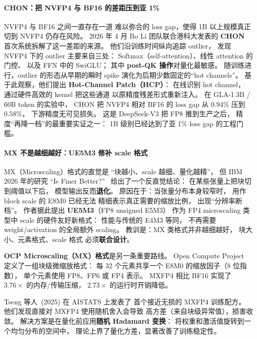 \paragraph{CHON：把 NVFP4 与 BF16 的差距压到亚 1\%}
NVFP4 与 BF16 之间一直存在一道
难以弥合的 loss gap，使得 1B 以上规模真正切到 NVFP4
仍存在风险。
2026 年 4 月 Bo Li 团队联合港科大发表的
\textbf{CHON}~\cite{chon_nvfp4_2026}
首次系统拆解了这一差距的来源。
他们沿训练时间纵向追踪 outlier，
发现 NVFP4 下的 outlier 主要来自三处：
Softmax（self-attention）、线性 attention 的门控、
以及 FFN 中的 SwiGLU；
其中\textbf{ post-QK 操作}对量化最敏感。
随训练进行，outlier 的形态从早期的瞬时 spike
演化为后期少数固定的“hot channels”。
基于此观察，他们提出
\textbf{Hot-Channel Patch（HCP）}：
在线识别 hot channel，
通过硬件高效的 kernel 把这些通道
以原精度残差形式重新注入。
在 GLA-1.3B / 60B token 的实验中，
CHON 把 NVFP4 相对 BF16 的 loss gap
从 $0.94\%$ 压到 $0.58\%$，
下游精度无可见损失。
这是 DeepSeek-V3 把 FP8 推到生产之后，
精度“再降一档”的最重要实证之一：
1B 级别已经达到了亚 1\% loss gap 的工程门槛。

\paragraph{MX 不是越细越好：UE5M3 修补 scale 格式}
MX（Microscaling）格式的直觉是
“块越小、scale 越细、量化越精”，
但 IBM 2026 年的研究
“Is Finer Better?”~\cite{ibm_microscaling_2026}
给出了一个反直觉结论：
在某些张量上把块切到阈值以下后，
模型输出反而\textbf{退化}。
原因在于：当张量分布本身较窄时，
用作 block scale 的 E8M0 已经无法
精细表示真正需要的缩放比例，
出现“分辨率断档”。
作者据此提出
\textbf{UE5M3}（FP8 unsigned E5M3）
作为 FP4 microscaling 类型中 scale 的硬件友好新格式：
性能与传统的 E4M3 等同，
不再需要 weight/activation 的全局额外 scaling。
教训是：MX 类格式并非越细越好，
块大小、元素格式、scale 格式
必须\textbf{联合设计}。

\textbf{OCP Microscaling（MX）格式}是另一条重要路线。%
Open Compute Project 定义了一组块级微缩放格式：
每 32 个元素共享一个 E8M0 的缩放因子（8 位指数），
单个元素使用 FP8、FP6 或 FP4 表示。
MXFP4 相比 BF16 实现了 $3.76\times$ 的内存/传输压缩，
$2.73\times$ 的运行时开销降低。

Tseng 等人~(2025) 在 AISTATS 上发表了%
首个接近无损的 MXFP4 训练配方。
他们发现直接对 MXFP4 使用随机舍入会导致
高方差（来自块级异常值），损害收敛。
解决方案是在量化前应用\textbf{随机 Hadamard 变换}：
将权重和激活值旋转到一个均匀分布的空间中，
理论上界了量化方差，显著改善了训练稳定性。

